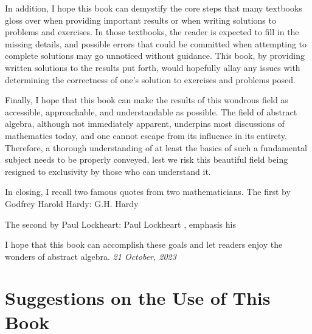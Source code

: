 In addition, I hope this book can demystify the core steps that many textbooks gloss over when providing important results or when writing solutions to problems and exercises. In those textbooks, the reader is expected to fill in the missing details, and possible errors that could be committed when attempting to complete solutions may go unnoticed without guidance. This book, by providing written solutions to the results put forth, would hopefully allay any issues with determining the correctness of one's solution to exercises and problems posed.

Finally, I hope that this book can make the results of this wondrous field as accessible, approachable, and understandable as possible. The field of abstract algebra, although not immediately apparent, underpins most discussions of mathematics today, and one cannot escape from its influence in its entirety. Therefore, a thorough understanding of at least the basics of such a fundamental subject needs to be properly conveyed, lest we risk this beautiful field being resigned to exclusivity by those who can understand it.

\newpage

In closing, I recall two famous quotes from two mathematicians. The first by Godfrey Harold Hardy:
    {G.H. Hardy}
    {\cite[p.~43]{hardy_snow_1969}}

The second by Paul Lockheart:
    {Paul Lockheart}
    {\cite[p.~8]{lockheart_2002}, emphasis his}

I hope that this book can accomplish these goals and let readers enjoy the wonders of abstract algebra.
\hfill{\textit{21 October, 2023}}

\chapter{Suggestions on the Use of This Book}

